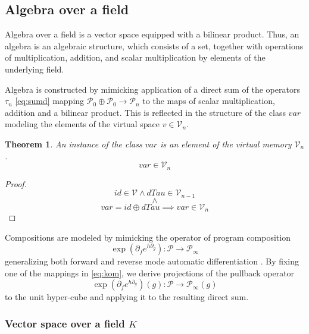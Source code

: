 \documentclass{article}
\newcommand{\VV}{\mathcal{V}}
\newcommand{\dP}{\mathcal{P}}
\newcommand{\D}{\partial}
\newcommand{\sumd}{\tau}
\newtheorem{izrek}{Theorem}[section]
\begin{document}
\subsection{Algebra over a field}\label{sec:Algebra}

 Algebra over a field is a vector space equipped with a bilinear product. Thus, an algebra is an algebraic structure, which consists of a set, together with operations of multiplication, addition, and scalar multiplication by elements of the underlying field. \cite[p.~3]{Algebra}
 
 Algebra is constructed by mimicking application of a direct sum of the operators $\sumd_n$ \eqref{eq:sumd} mapping $\dP_0\oplus\dP_0\to\dP_n$ to the maps of scalar multiplication, addition and a bilinear product. This is reflected in the structure of the class $var$  modeling the elements of the virtual space $v\in\VV_n$. 
 
 \begin{izrek}
 An instance of the class $var$ is an element of the virtual memory $\VV_n$.
  \begin{equation}
  var\in\VV_n
  \end{equation}
 \end{izrek}
 \begin{proof}
 \begin{equation}
  id\in \VV\land  dTau\in \VV_{n-1}
  \end{equation}
  $$\land$$
  \begin{equation}
  var=id\oplus dTau\implies var\in\VV_n
  \end{equation}
 \end{proof}
 
 Compositions are modeled by mimicking the operator of program composition \cite[Theorem~5.6]{OperationalCalculus}
 \begin{equation}\label{eq:kom}
   \exp(\D_fe^{h\D_g}): \dP\to\dP_\infty
   \end{equation}
 generalizing both forward and reverse mode automatic differentiation \cite[Claim~5.3]{OperationalCalculus}. By fixing one of the mappings in \eqref{eq:kom}, we derive projections of the pullback operator
 \begin{equation}\label{eq:komp}
    \exp(\D_fe^{h\D_g})(g): \dP\to\dP_\infty(g)
    \end{equation}
  to the unit hyper-cube and applying it to the resulting direct sum.

\subsubsection{Vector space over a field $K$}
 
\end{document}
